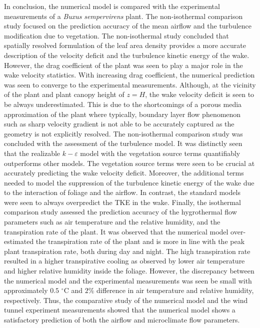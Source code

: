 In conclusion, the numerical model is compared with the experimental measurements of a \textit{Buxus} \textit{sempervirens} plant. The non-isothermal comparison study focused on the prediction accuracy of the mean airflow and the turbulence modification due to vegetation. The non-isothermal study concluded that spatially resolved formulation of the leaf area density provides a more accurate description of the velocity deficit and the turbulence kinetic energy of the wake. However, the drag coefficient of the plant was seen to play a major role in the wake velocity statistics. With increasing drag coefficient, the numerical prediction was seen to converge to the experimental measurements. Although, at the vicinity of the plant and plant canopy height of $z=H$, the wake velocity deficit is seen to be always underestimated. This is due to the shortcomings of a porous media approximation of the plant where typically, boundary layer flow phenomenon such as sharp velocity gradient is not able to be accurately captured as the geometry is not explicitly resolved. The non-isothermal comparison study was concluded with the assessment of the turbulence model. It was distinctly seen that the realizable $k-\varepsilon$ model with the vegetation source terms quantifiably outperforms other models. The vegetation source terms were seen to be crucial at accurately predicting the wake velocity deficit. Moreover, the additional terms needed to model the suppression of the turbulence kinetic energy of the wake due to the interaction of foliage and the airflow. In contrast, the standard models were seen to always overpredict the TKE in the wake. Finally, the isothermal comparison study assessed the prediction accuracy of the hygrothermal flow parameters such as air temperature and the relative humidity, and the transpiration rate of the plant. It was observed that the numerical model over-estimated the transpiration rate of the plant and is more in line with the peak plant transpiration rate, both during day and night. The high transpiration rate resulted in a higher transpirative cooling as observed by lower air temperature and higher relative humidity inside the foliage. However, the discrepancy between the numerical model and the experimental measurements was seen be small with approximately $0.5$ $^{\circ}$C and $2\%$ difference in air temperature and relative humidity, respectively. Thus, the comparative study of the numerical model and the wind tunnel experiment measurements showed that the numerical model shows a satisfactory prediction of both the airflow and microclimate flow parameters.